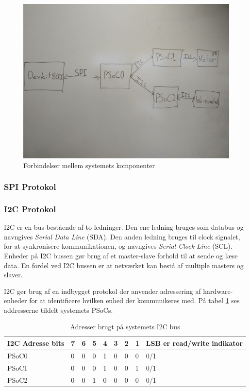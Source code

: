 \begin{figure}[H]
	\centering
	\includegraphics[width=\textwidth] {Systemarkitektur/images/overordnetstruktur}
	\caption{Forbindelser mellem systemets komponenter}
	\label{fig:kommunikationsOverblik}
\end{figure}

\subsubsection{SPI Protokol}

\subsubsection{I2C Protokol}

I2C\cite{I2C} er en bus bestående af to ledninger. Den ene ledning bruges som databus og navngives \textit{Serial Data Line} (SDA). Den anden ledning bruges til clock signalet, for at synkronisere kommunikationen, og navngives \textit{Serial Clock Line} (SCL). Enheder på I2C bussen gør brug af et master-slave forhold til at sende og læse data. En fordel ved I2C bussen er at netværket kan bestå af multiple masters og slaver.

I2C gør brug af en indbygget protokol der anvender adressering af hardware-enheder for at identificere hvilken enhed der kommunikeres med. På tabel \ref{table:I2CAdress} ses addresserne tildelt systemets PSoCs.

\begin{table}[H]
	\centering
	\begin{tabular}{l|lllllll|l}
		\hline
		I2C Adresse bits & 7 & 6 & 5 & 4 & 3 & 2 & 1 & LSB er read/write indikator \\ \hline
		PSoC0        & 0 & 0 & 0 & 1 & 0 & 0 & 0 & 0/1                        \\
		PSoC1        & 0 & 0 & 0 & 1 & 0 & 0 & 1 & 0/1                        \\
		PSoC2        & 0 & 0 & 1 & 0 & 0 & 0 & 0 & 0/1                        \\ \hline
	\end{tabular}
	\caption{Adresser brugt på systemets I2C bus}
	\label{table:I2CAdress}
\end{table}

